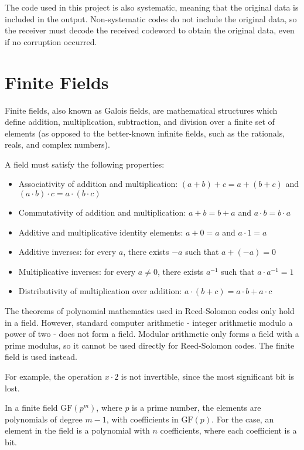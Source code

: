 The code used in this project is also systematic, meaning that the original data is included in the output.
Non-systematic codes do not include the original data, so the receiver must decode the received codeword to obtain the original data, even if no corruption occurred.

\section{Finite Fields}

Finite fields, also known as Galois fields, are mathematical structures which define addition, multiplication, subtraction, and division over a finite set of elements \cite{finite-fields-2nd-ed}
(as opposed to the better-known infinite fields, such as the rationals, reals, and complex numbers).

A field must satisfy the following properties:

\begin{itemize}[nosep]
    \item Associativity of addition and multiplication: $(a + b) + c = a + (b + c)$ and $(a \cdot b) \cdot c = a \cdot (b \cdot c)$
    \item Commutativity of addition and multiplication: $a + b = b + a$ and $a \cdot b = b \cdot a$
    \item Additive and multiplicative identity elements: $a + 0 = a$ and $a \cdot 1 = a$
    \item Additive inverses: for every $a$, there exists $-a$ such that $a + (-a) = 0$
    \item Multiplicative inverses: for every $a \neq 0$, there exists $a^{-1}$ such that $a \cdot a^{-1} = 1$
    \item Distributivity of multiplication over addition: $a \cdot (b + c) = a \cdot b + a \cdot c$
\end{itemize}

The theorems of polynomial mathematics used in Reed-Solomon codes only hold in a field. However, standard computer arithmetic - integer arithmetic modulo a power of two - does not form a field.
Modular arithmetic only forms a field with a prime modulus, so it cannot be used directly for Reed-Solomon codes. The finite field  is used instead.

For example, the operation $x \cdot 2$ is not invertible, since the most significant bit is lost.

In a finite field $\text{GF}(p^m)$, where $p$ is a prime number, the elements are polynomials of degree $m - 1$, with coefficients in $\text{GF}(p)$.
For the  case, an element in the field is a polynomial with $n$ coefficients, where each coefficient is a bit.

